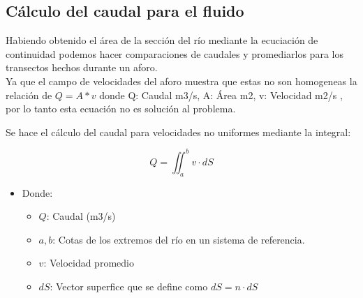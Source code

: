 \documentclass[12pt,a4paper]{report}
\begin{document}
\subsection{Cálculo del caudal para el fluido}
Habiendo obtenido el área de la sección del río mediante la ecuciación de continuidad podemos hacer comparaciones de caudales y promediarlos para los transectos hechos durante un aforo.\\

Ya que el campo de velocidades del aforo muestra que estas no son homogeneas la relación de $Q= A * v$ donde Q: Caudal {m3/s}, A: Área {m2}, v: Velocidad {m2/s} , por lo tanto esta ecuación no es solución al problema.

Se hace el cálculo del caudal para velocidades no uniformes mediante la integral:

\[Q = \iint_{a}^{b}v\cdot dS\]

\begin{itemize}
\item Donde:
\begin{itemize}
\item $Q$: Caudal (m3/s)
\item $a, b$: Cotas de los extremos del río en un sistema de referencia.
\item $v$: Velocidad promedio
\item $dS$: Vector superfice que se define como $dS = n\cdot dS$
\end{itemize}
\end{itemize}
\end{document}
